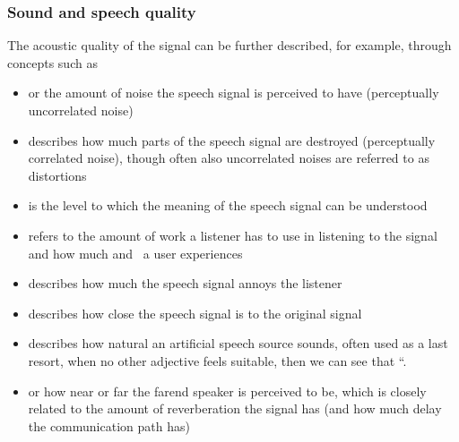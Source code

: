 \documentclass[letterpaper,10pt,english]{jupyterBook}
\begin{document}
\subsubsection{Sound and speech quality}
\label{\detokenize{Evaluation/Subjective_quality_evaluation:sound-and-speech-quality}}
\sphinxAtStartPar
The acoustic quality of the signal can be further described, for
example, through concepts such as
\begin{itemize}
\item {} 
\sphinxAtStartPar
{} or the amount of noise the speech signal is perceived to
have (perceptually uncorrelated noise)

\item {} 
\sphinxAtStartPar
{} describes how much parts of the speech signal are
destroyed (perceptually correlated noise), though often also
uncorrelated noises are referred to as distortions

\item {} 
\sphinxAtStartPar
{} is the level to which the meaning of the speech
signal can be understood

\item {} 
\sphinxAtStartPar
{} refers to the amount of work a listener has to
use in listening to the signal and how much 
and  a user experiences

\item {} 
\sphinxAtStartPar
{} describes how much the speech signal annoys the
listener

\item {} 
\sphinxAtStartPar
{} describes how close the speech signal is to the
original signal

\item {} 
\sphinxAtStartPar
{} describes how natural an artificial speech source
sounds, often used as a last resort, when no other adjective feels
suitable, then we can see that “.

\item {} 
\sphinxAtStartPar
{} or how near or far the far\sphinxhyphen{}end speaker is
perceived to be, which is closely related to the amount of
reverberation the signal has (and how much delay the communication
path has)

\end{itemize}
\end{document}
